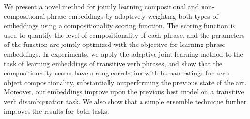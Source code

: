 We present a novel method for jointly learning compositional and non-compositional phrase embeddings by adaptively weighting both types of embeddings using a compositionality scoring function. The scoring function is used to quantify the level of compositionality of each phrase, and the parameters of the function are jointly optimized with the objective for learning phrase embeddings. In experiments, we apply the adaptive joint learning method to the task of learning embeddings of transitive verb phrases, and show that the compositionality scores have strong correlation with human ratings for verb-object compositionality, substantially outperforming the previous state of the art. Moreover, our embeddings improve upon the previous best model on a transitive verb disambiguation task. We also show that a simple ensemble technique further improves the results for both tasks.
